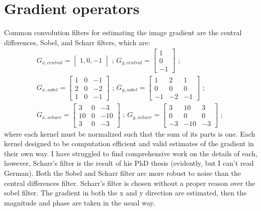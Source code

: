 \section{Gradient operators} \label{sec:gradientoperators}
\par
Common convolution filters for estimating the image gradient are the central differences, Sobel, and Scharr filters, which are:
%
\begin{gather*}
G_{x,central} = 
\begin{bmatrix}
1, 0, -1
\end{bmatrix}
\text{ ; }
G_{y,central} = 
\begin{bmatrix}
1 \\ 0 \\ -1
\end{bmatrix}
\text{ ; } \\
G_{x,sobel} = 
\begin{bmatrix}
1 & 0 & -1 \\
2 & 0 & -2 \\
1 & 0 & -1
\end{bmatrix}
\text{ ; }
G_{y,sobel} = 
\begin{bmatrix}
1 & 2 & 1 \\
0 & 0 & 0 \\
-1 & -2 & -1
\end{bmatrix}
\text{ ; } \\
G_{x,scharr} = 
\begin{bmatrix}
3 & 0 & -3 \\
10 & 0 & -10 \\
3 & 0 & -3
\end{bmatrix}
\text{ ; }
G_{y,scharr} = 
\begin{bmatrix}
3 & 10 & 3 \\
0 & 0 & 0 \\
-3 & -10 & -3
\end{bmatrix}
\text{ ; }
\end{gather*}
%
where each kernel must be normalized such that the sum of its parts is one.
Each kernel designed to be computation efficient and valid estimates of the gradient in their own way.
I have struggled to find comprehensive work on the details of each, however, Scharr's filter is the result of his PhD thesis (evidently, but I can't read German).
Both the Sobel and Scharr filter are more robust to noise than the central differences filter.
Scharr's filter is chosen without a proper reason over the sobel filter.
The gradient in both the x and y direction are estimated, then the magnitude and phase are taken in the usual way.
%
